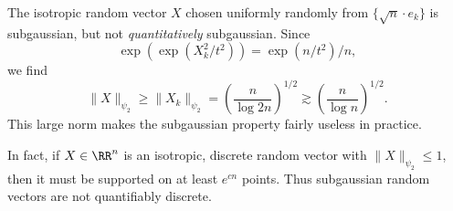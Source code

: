 \begin{example}
    The isotropic random vector $X$ chosen uniformly randomly from $\{ \sqrt{n} \cdot e_k \}$ is subgaussian, but not {\it quantitatively} subgaussian. Since
    \[ \exp \left( \exp(X_k^2/t^2) \right) = \exp(n/t^2)/n, \]
    we find
    \[ \| X \|_{\psi_2} \geq \| X_k \|_{\psi_2} = \left( \frac{n}{\log 2n} \right)^{1/2} \gtrsim \left( \frac{n}{\log n} \right)^{1/2}. \]
    This large norm makes the subgaussian property fairly useless in practice.
\end{example}

In fact, if $X \in \RR^n$ is an isotropic, discrete random vector with $\| X \|_{\psi_2} \leq 1$, then it must be supported on at least $e^{cn}$ points. Thus subgaussian random vectors are not quantifiably discrete.


